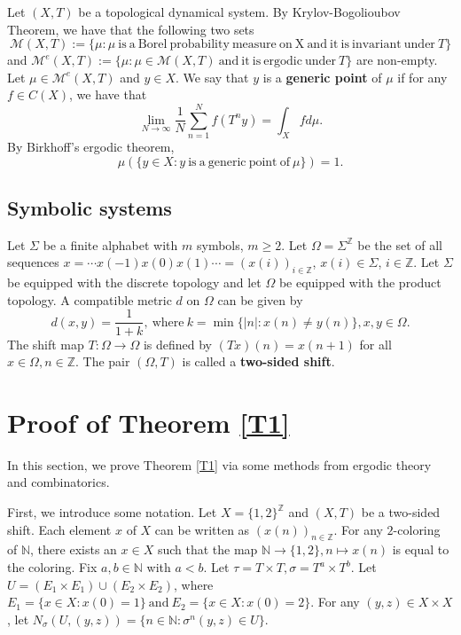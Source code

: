 \documentclass[reqno,12pt]{amsart}
\def \N {\mathbb N}
\def \Z {\mathbb Z}
\numberwithin{equation}{section}
\begin{document}
Let  $(X,T)$ be a topological dynamical system. By Krylov-Bogolioubov Theorem, we have that the following two sets $$\mathcal{M}(X,T):=\{\mu:\mu\ \text{is}\ \text{a}\ \text{Borel}\ \text{probability}\ \text{measure}\ \text{on}\ \text{X}\ \text{and}\ \text{it}\ \text{is}\ \text{invariant}\ \text{under}\ T\}$$ and $\mathcal{M}^{e}(X,T):=\{\mu:\mu\in \mathcal{M}(X,T)\ \text{and}\ \text{it}\ \text{is}\ \text{ergodic}\ \text{under}\ T\}$ are non-empty.
Let $\mu\in \mathcal{M}^{e}(X,T)$ and $y\in X$. We say that $y$ is a \textbf{generic point} of $\mu$ if for any $f\in C(X)$, we have that  $$\lim_{N\to\infty}\frac{1}{N}\sum_{n=1}^{N}f(T^{n}y)=\int_{X}fd\mu.$$ By Birkhoff's ergodic theorem, $$\mu(\{y\in X:y\ \text{is}\ \text{a}\ \text{generic}\ \text{point}\ \text{of}\ \mu\})=1.$$
\subsection{Symbolic systems}
Let $\Sigma$ be a finite alphabet with $m$ symbols, $m \ge 2$. Let $\Omega=\Sigma^{\Z}$ be the
set of all sequences $x=\cdots x(-1)x(0)x(1) \cdots=(x(i))_{i\in \Z}$, $x(i) \in
\Sigma$, $i \in \Z$. 
Let $\Sigma$ be equipped with the discrete topology and let $\Omega$ be equipped with the product topology. A compatible metric $d$ on $\Omega$ can be
given by $$d(x,y)=\frac{1}{1+k},\ \text{where}\ k=\min \{|n|:x(n) \not= y(n)
\},x,y \in \Omega.$$ The shift map $T: \Omega \longrightarrow \Omega$
is defined by $(T x)(n) = x(n+1)$ for all $x\in \Omega,n \in \Z$. The
pair $(\Omega,T)$ is called a \textbf{two-sided shift}.

\section{Proof of Theorem \ref{T1}}\label{SA}
In this section, we prove Theorem \ref{T1} via some methods from ergodic theory and combinatorics.

First, we introduce some notation.
Let $X=\{1,2\}^{\Z}$ and $(X,T)$ be a two-sided shift. Each element $x$ of $X$ can be written as $(x(n))_{n\in \Z}$. For any $2$-coloring of $\N$, there exists an $x\in X$ such that the map $\N\to \{1,2\},n\mapsto x(n)$ is equal to the coloring.
Fix $a,b\in\N$ with $a<b$. Let $\tau=T\times T,\sigma=T^{a}\times T^{b}$. Let $U=(E_1\times E_1)\cup (E_2\times E_2)$, where $E_1=\{x\in X:x(0)=1\}\ \text{and}\ E_2=\{x\in X:x(0)=2\}$. For any $(y,z)\in X\times X$, let $N_{\sigma}(U,(y,z))=\{n\in \N: \sigma^{n}(y,z)\in U\}$. 
\end{document}

